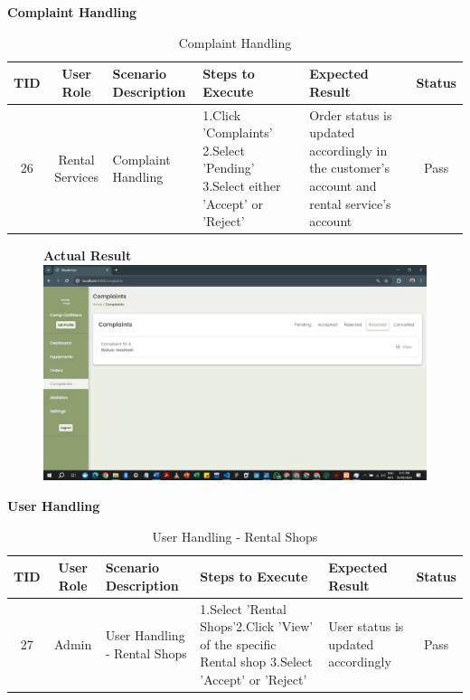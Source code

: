 \textbf{Complaint Handling}\\
\begin{table}[ht]
\centering
\begin{tabularx}{\textwidth}{|c|c|X|X|X|c|}
\hline
\textbf{TID} & \textbf{User Role} & \textbf{Scenario Description} & \textbf{Steps to Execute} & \textbf{Expected Result} & \textbf{Status} \\ \hline
26 & Rental Services & Complaint Handling & 1.Click 'Complaints' \newline2.Select 'Pending' \newline3.Select either 'Accept' or 'Reject' & Order status is updated accordingly in the customer's account and rental service's account & Pass \\ \hline
\end{tabularx}
\caption{Complaint Handling}
\end{table}

\begin{figure}[h!]
    \centering
    \textbf{Actual Result}
    \includegraphics[width=1\textwidth]{Images/Test Cases/26. Complaints.png}
\end{figure}
\clearpage


\textbf{User Handling}\\
\begin{table}[ht]
\centering
\begin{tabularx}{\textwidth}{|c|c|X|X|X|c|}
\hline
\textbf{TID} & \textbf{User Role} & \textbf{Scenario Description} & \textbf{Steps to Execute} & \textbf{Expected Result} & \textbf{Status} \\ \hline
27 & Admin & User Handling - Rental Shops & 1.Select 'Rental Shops'\newline 2.Click 'View' of the specific Rental shop \newline3.Select 'Accept' or 'Reject' & User status is updated accordingly & Pass \\ \hline
\end{tabularx}
\caption{User Handling - Rental Shops}
\end{table}

